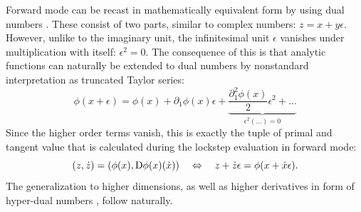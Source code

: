 Forward mode can be recast in mathematically equivalent form by using dual numbers
\parencites[see][section 3.1.1]{baydin2018automatic}{deakin1966functions}.  These consist of two
parts, similar to complex numbers: \(z = x + y\epsilon\).  However, unlike to the imaginary unit,
the infinitesimal unit \(\epsilon\) vanishes under multiplication with itself: \(\epsilon^2 = 0\).
The consequence of this is that analytic functions can naturally be extended to dual numbers by
nonstandard interpretation as truncated Taylor series:
\begin{equation}
  \phi(x + \epsilon) = \phi(x) + \partial_1\phi(x)\epsilon + \underbrace{\frac{\partial^2_1\phi(x)}{2}\epsilon^2
  + \ldots}_{\epsilon^2 (\ldots) = 0}
\end{equation}
Since the higher order terms vanish, this is exactly the tuple of primal and tangent value that is
calculated during the lockstep evaluation in forward mode:
\begin{equation}
  (z, \dot{z}) = (\phi(x), \mathop{}\!\mathrm{D}\phi(x)(\dot{x})) \quad\Leftrightarrow\quad z + \dot{z}\epsilon = \phi(x + \dot{x}\epsilon).
\end{equation}
The generalization to higher dimensions, as well as higher derivatives in form of hyper-dual numbers
\parencite{fike2012automatic}, follow naturally.





